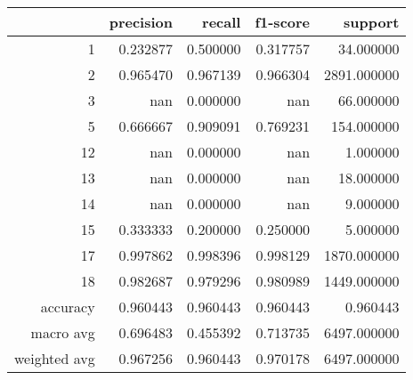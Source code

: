 \begin{table}[h]
\centering
\label{table:5}
\begin{tabular}{rrrrr}
\toprule
 & precision & recall & f1-score & support \\
\midrule
1 & 0.232877 & 0.500000 & 0.317757 & 34.000000 \\
2 & 0.965470 & 0.967139 & 0.966304 & 2891.000000 \\
3 & nan & 0.000000 & nan & 66.000000 \\
5 & 0.666667 & 0.909091 & 0.769231 & 154.000000 \\
12 & nan & 0.000000 & nan & 1.000000 \\
13 & nan & 0.000000 & nan & 18.000000 \\
14 & nan & 0.000000 & nan & 9.000000 \\
15 & 0.333333 & 0.200000 & 0.250000 & 5.000000 \\
17 & 0.997862 & 0.998396 & 0.998129 & 1870.000000 \\
18 & 0.982687 & 0.979296 & 0.980989 & 1449.000000 \\
accuracy & 0.960443 & 0.960443 & 0.960443 & 0.960443 \\
macro avg & 0.696483 & 0.455392 & 0.713735 & 6497.000000 \\
weighted avg & 0.967256 & 0.960443 & 0.970178 & 6497.000000 \\
\bottomrule
\end{tabular}
\end{table}
